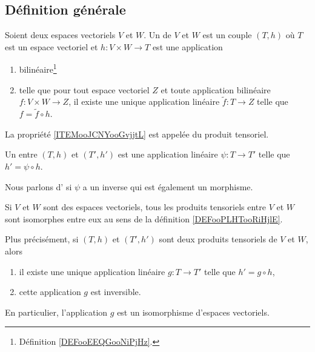 \subsection{Définition générale}

\begin{definition}       \label{DEFooXKKQooAvWRNp}
	Soient deux espaces vectoriels \( V\) et \( W\). Un  de \( V\) et \( W\) est un couple \( (T,h)\) où \( T\) est un espace vectoriel et \( h\colon V\times W\to T\) est une application
	\begin{enumerate}
		\item
		      bilinéaire\footnote{Définition \ref{DEFooEEQGooNiPjHz}.}
		\item       \label{ITEMooJCNYooGvjjtL}
		      telle que pour tout espace vectoriel \( Z\) et toute application bilinéaire \( f\colon V\times W\to Z\), il existe une unique application linéaire \( \tilde f\colon T\to Z\) telle que \( f=\tilde f\circ h\).
	\end{enumerate}
	La propriété \ref{ITEMooJCNYooGvjjtL} est appelée  du produit tensoriel.
\end{definition}

\begin{definition}  \label{DEFooPLHTooRiHjlE}
	Un  entre \( (T,h)\) et \( (T',h')\) est une application linéaire \( \psi\colon T\to T'\) telle que \( h'=\psi\circ h\).

	Nous parlons d' si \( \psi\) a un inverse qui est également un morphisme.
\end{definition}

\begin{proposition}      \label{PROPooROPHooQXqNzZ}
	Si \( V\) et \( W\) sont des espaces vectoriels, tous les produits tensoriels entre \( V\) et \( W\) sont isomorphes entre eux au sens de la définition \ref{DEFooPLHTooRiHjlE}.

	Plus précisément, si \( (T,h)\) et \( (T',h')\) sont deux produits tensoriels de \( V\) et \( W\), alors
	\begin{enumerate}
		\item
		      il existe une unique application linéaire \( g\colon T\to T'\) telle que \( h'=g\circ h\),
		\item
		      cette application \( g\) est inversible.
	\end{enumerate}
	En particulier, l'application \( g\) est un isomorphisme d'espaces vectoriels.
\end{proposition}

